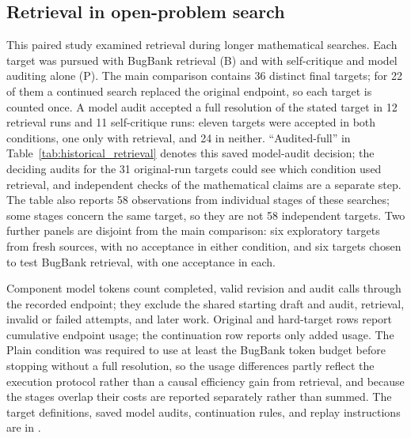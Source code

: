 \subsection{Retrieval in open-problem search}
\label{app:historical-retrieval}
This paired study examined retrieval during longer mathematical searches. Each target was pursued with BugBank retrieval (B) and with self-critique and model auditing alone (P). The main comparison contains 36 distinct final targets; for 22 of them a continued search replaced the original endpoint, so each target is counted once. A model audit accepted a full resolution of the stated target in 12 retrieval runs and 11 self-critique runs: eleven targets were accepted in both conditions, one only with retrieval, and 24 in neither. ``Audited-full'' in Table~\ref{tab:historical_retrieval} denotes this saved model-audit decision; the deciding audits for the 31 original-run targets could see which condition used retrieval, and independent checks of the mathematical claims are a separate step. The table also reports 58 observations from individual stages of these searches; some stages concern the same target, so they are not 58 independent targets. Two further panels are disjoint from the main comparison: six exploratory targets from fresh sources, with no acceptance in either condition, and six targets chosen to test BugBank retrieval, with one acceptance in each.

Component model tokens count completed, valid revision and audit calls through the recorded endpoint; they exclude the shared starting draft and audit, retrieval, invalid or failed attempts, and later work. Original and hard-target rows report cumulative endpoint usage; the continuation row reports only added usage. The Plain condition was required to use at least the BugBank token budget before stopping without a full resolution, so the usage differences partly reflect the execution protocol rather than a causal efficiency gain from retrieval, and because the stages overlap their costs are reported separately rather than summed. The target definitions, saved model audits, continuation rules, and replay instructions are in .

